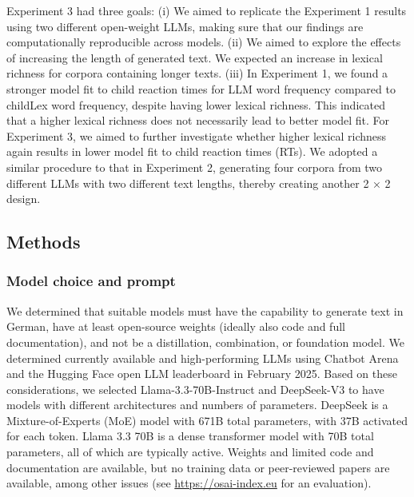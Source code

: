 \documentclass[doc, a4paper, anonymous]{apa7}
\begin{document}
Experiment 3 had three goals: (i) We aimed to replicate the Experiment 1 results using two different open-weight LLMs, making sure that our findings are computationally reproducible across models. (ii) We aimed to explore the effects of increasing the length of generated text. We expected an increase in lexical richness for corpora containing longer texts. (iii) In Experiment 1, we found a stronger model fit to child reaction times for LLM word frequency compared to childLex word frequency, despite having lower lexical richness. This indicated that a higher lexical richness does not necessarily lead to better model fit. For Experiment 3, we aimed to further investigate whether higher lexical richness again results in lower model fit to child reaction times (RTs). We adopted a similar procedure to that in Experiment 2, generating four corpora from two different LLMs with two different text lengths, thereby creating another 2 × 2 design. 


\subsection{Methods}

\subsubsection{Model choice and prompt}

We determined that suitable models must have the capability to generate text in German, have at least open-source weights (ideally also code and full documentation), and not be a distillation, combination, or foundation model. We determined currently available and high-performing LLMs using Chatbot Arena \citep{chiang_chatbot_2024} and the Hugging Face open LLM leaderboard \citep{fourrier_open_2024} in February 2025. Based on these considerations, we selected Llama-3.3-70B-Instruct \citep{grattafiori_llama_2024} and DeepSeek-V3 \citep{liu_deepseek-v3_2024} to have models with different architectures and numbers of parameters. DeepSeek is a Mixture-of-Experts (MoE) model with 671B total parameters, with 37B activated for each token. Llama 3.3 70B is a dense transformer model with 70B total parameters, all of which are typically active. Weights and limited code and documentation are available, but no training data or peer-reviewed papers are available, among other issues (see \url{https://osai-index.eu} for an evaluation).  
\end{document}
